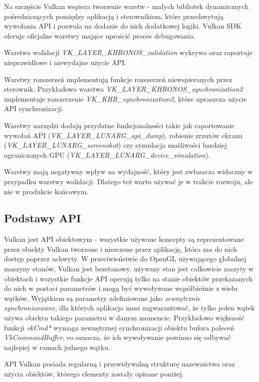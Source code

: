 Na szczęście Vulkan wspiera tworzenie warstw - małych bibliotek dynamicznych pośredniczących pomiędzy aplikacją i sterownikiem, które przechwytują wywołania API i pozwala na dodanie do nich dodatkowej logiki.
Vulkan SDK oferuje oficjalne warstwy mające uprościć proces debugowania.

Warstwa walidacji \textit{VK\_LAYER\_KHRONOS\_validation} wykrywa oraz raportuje nieprawidłowe i niewydajne użycie API.

Warstwy rozszerzeń implementują funkcje rozszerzeń niewspieranych przez sterownik. Przykładowo warstwa \textit{VK\_LAYER\_KHRONOS\_synchronization2} implementuje rozszerzenie \textit{VK\_KHR\_synchronization2}, które upraszcza użycie API synchronizacji.

Warstwy narzędzi dodają przydatne funkcjonalności takie jak raportowanie wywołań API (\textit{VK\_LAYER\_LUNARG\_api\_dump}), robienie zrzutów ekranu (\textit{VK\_LAYER\_LUNARG\_screenshot}) czy symulacja możliwości bardziej ograniczonych GPU (\textit{VK\_LAYER\_LUNARG\_device\_simulation}).

Warstwy mają negatywny wpływ na wydajność, który jest zwłaszcza widoczny w przypadku warstwy walidacji. Dlatego też warto używać je w trakcie rozwoju, ale nie w produkcie końcowym.

\subsection{Podstawy API}

Vulkan jest API obiektowym - wszystkie używane koncepty są reprezentowane przez obiekty Vulkan tworzone i niszczone przez aplikację, która ma do nich dostęp poprzez uchwyty.
W przeciwieństwie do OpenGL używającego globalnej maszyny stanów, Vulkan jest bezstanowy, używany stan jest całkowicie zaszyty w obiektach i wszystkie funkcje API operują tylko na stanie obiektów przekazanych do nich w postaci parametrów i mogą być wywoływane współbieżnie z wielu wątków.
Wyjątkiem są parametry zdefiniowane jako \textit{zewnętrznie synchronizowane}, dla których aplikacja musi zagwarantować, że tylko jeden wątek używa obiektu takiego parametru w danym momencie.
Przykładowo większość funkcji \textit{vkCmd*} wymaga zewnętrznej synchronizacji obiektu bufora poleceń \textit{VkCommandBuffer}, co oznacza, że ich wywoływanie powinno się odbywać najlepiej w ramach jednego wątku.

API Vulkan posiada regularną i przewidywalną strukturę nazewnictwa oraz użycia obiektów, którego elementy zostały opisane poniżej.

